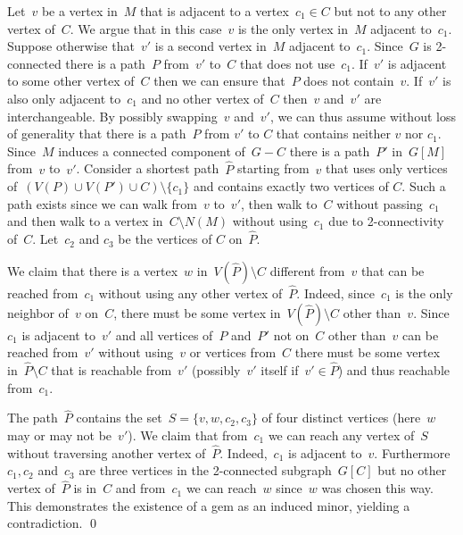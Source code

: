 \documentclass[envcountsame,envcountsect,11pt,a4paper]{llncs}
\renewenvironment{proof}{\begin{Proof}}{\qed\end{Proof}}
\begin{document}
\begin{proof}
Let~$v$ be a vertex in~$M$ that is adjacent to a vertex~$c_1\in C$ but not to any other vertex of~$C$. We argue that in this case~$v$ is the
only vertex in~$M$ adjacent to~$c_1$. Suppose otherwise that~$v'$ is a second vertex in~$M$ adjacent to~$c_1$.
Since~$G$ is 2-connected there is a path~$P$ from~$v'$ to~$C$ that does not use~$c_1$.
If~$v'$ is adjacent to some other vertex of~$C$ then we can ensure that~$P$ does not contain~$v$.
If~$v'$ is also only adjacent to~$c_1$ and no other vertex of~$C$ then~$v$ and~$v'$ are interchangeable.
By possibly swapping~$v$ and~$v'$, we can thus assume without loss of generality that
there is a path~$P$ from $v'$ to $C$ that contains neither $v$ nor $c_{1}$.
Since~$M$ induces a connected component of~$G-C$ there is a path~$P'$ in~$G[M]$ from~$v$ to~$v'$.
Consider a shortest path~$\widehat{P}$ starting from~$v$ that uses only vertices of~$(V(P) \cup V(P') \cup C)\setminus \{c_1\}$ and contains exactly two vertices of $C$.
Such a path exists since we can walk from~$v$ to~$v'$, then walk to~$C$ without passing~$c_1$ and then walk to a vertex
in~$C\setminus N(M)$ without using~$c_1$ due to 2-connectivity of~$C$.
Let~$c_{2}$ and $c_3$ be the vertices of $C$ on~$\widehat{P}$.
 
We claim that there is a vertex~$w$ in~$V(\widehat{P})\setminus C$ different from~$v$ that can be reached from~$c_1$ without using any other
vertex of~$\widehat{P}$. Indeed, since~$c_1$ is the only neighbor of~$v$ on~$C$, there must be some vertex in~$V(\widehat{P})\setminus C$
other than~$v$. Since~$c_1$ is adjacent to~$v'$ and all vertices of~$P$ and~$P'$ not on~$C$ other than~$v$ can be reached from~$v'$ without
using~$v$ or vertices from~$C$ there must be some vertex in~$\widehat{P}\setminus C$ that is reachable from~$v'$ (possibly~$v'$ itself
if~$v'\in \widehat{P}$) and thus reachable from~$c_1$.

The path~$\widehat{P}$ contains the set~$S= \{v,w,c_2,c_3\}$ of four distinct vertices (here~$w$ may or may not be~$v'$). We claim that
from~$c_1$ we can reach any vertex of~$S$ without traversing another vertex of~$\widehat{P}$. Indeed,~$c_1$ is adjacent
to~$v$. Furthermore~$c_1,c_2$ and~$c_3$ are three vertices in the 2-connected subgraph~$G[C]$ but no other vertex of~$\widehat{P}$ is in~$C$ and
from~$c_1$ we can reach~$w$ since~$w$ was chosen this way. This demonstrates the existence of a gem as an induced minor, yielding a
contradiction.
\end{proof}
\end{document}
